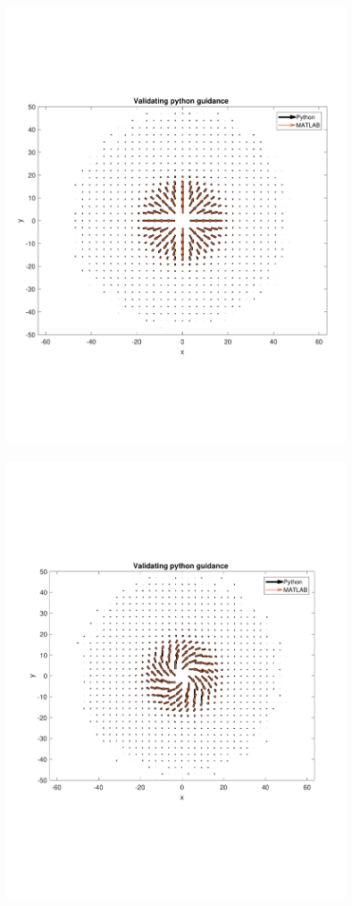 \documentclass[numbered,pdftex]{ohio-etd}
\begin{document}
\begin{figure}
	\centering
	\includegraphics[trim=0 140 0 140,clip,width=10cm]{PaperFigures/Methods/resultsPython/obstacleWithDecay}
	\caption{}
	\label{fig:dubinspaths}
\end{figure}

\begin{figure}
	\centering
	\includegraphics[trim=0 160 0 160,clip,width=10cm]{PaperFigures/Methods/resultsPython/obstacleWithDecayAndCirculation}
	\caption{}
	\label{fig:dubinspaths}
\end{figure}
\end{document}
